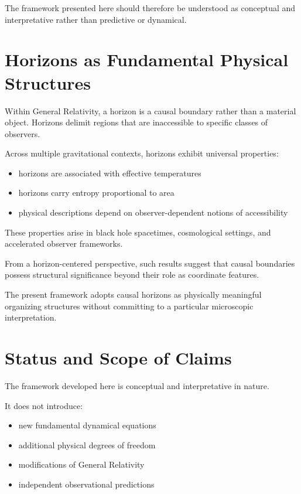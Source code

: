 \documentclass[12pt,a4paper]{article}
\begin{document}
The framework presented here should therefore be understood as conceptual and interpretative rather than predictive or dynamical.

\section{Horizons as Fundamental Physical Structures}

Within General Relativity, a horizon is a causal boundary rather than a material object. Horizons delimit regions that are inaccessible to specific classes of observers.

Across multiple gravitational contexts, horizons exhibit universal properties:

\begin{itemize}
  \item horizons are associated with effective temperatures
  \item horizons carry entropy proportional to area
  \item physical descriptions depend on observer-dependent notions of accessibility
\end{itemize}

These properties arise in black hole spacetimes, cosmological settings, and accelerated observer frameworks.

From a horizon-centered perspective, such results suggest that causal boundaries possess structural significance beyond their role as coordinate features.

The present framework adopts causal horizons as physically meaningful organizing structures without committing to a particular microscopic interpretation.

\section{Status and Scope of Claims}

The framework developed here is conceptual and interpretative in nature.

It does not introduce:

\begin{itemize}
  \item new fundamental dynamical equations
  \item additional physical degrees of freedom
  \item modifications of General Relativity
  \item independent observational predictions
\end{itemize}
\end{document}
